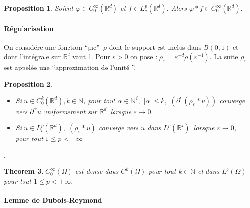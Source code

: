 \documentclass[3pt]{article}
\newtheorem{theorem}{Theorem}
\newtheorem{proposition}[theorem]{Proposition}
\begin{document}
\bigskip 

\begin{proposition}
Soient $\varphi \in C_{0}^{\infty }(\mathbb{R}^{d})$ et $f\in L_{c}^{p}(%
\mathbb{R}^{d}).$ Alors $\varphi \ast f\in C_{0}^{\infty }(\mathbb{R}^{d}).$
\end{proposition}

\bigskip 

\paragraph{R\'{e}gularisation}

\bigskip 

On consid\'{e}re une fonction \textquotedblleft pic\textquotedblright\ $\rho 
$ dont le support est inclus dans $B(0,1)$ et dont l'int\'{e}grale sur $%
\mathbb{R}^{d}$ vaut 1. Pour $\varepsilon >0$ on pose : $\rho _{\varepsilon
}=\varepsilon ^{-d}\rho (\varepsilon ^{-1})$. La suite $\rho _{\varepsilon }$
est appel\'{e}e une \textquotedblleft approximation de l'unit\'{e}%
\textquotedblright .

\bigskip 

\begin{proposition}

\begin{itemize}
\item Si $u\in C_{0}^{k}(\mathbb{R}^{d}),k\in \mathbb{N}$, pour tout $\alpha
\in \mathbb{N}^{d},$ $\left\vert \alpha \right\vert \leq k,$ $\left(
\partial ^{\alpha }\left( \rho _{\varepsilon }\ast u\right) \right) $
converge vers $\partial ^{\alpha }u$ uniformement sur $\mathbb{R}^{d}$\
lorsque $\varepsilon \rightarrow 0.$

\item Si $u\in L_{c}^{p}(\mathbb{R}^{d}),$ $\left( \rho _{\varepsilon }\ast
u\right) $ converge vers $u$ dans $L^{p}(\mathbb{R}^{d})$\ lorsque $%
\varepsilon \rightarrow 0$, pour tout $1\leq p<+\infty $
\end{itemize}
\end{proposition}

\bigskip ,

\begin{theorem}
$C_{0}^{\infty }(\mathbb{\Omega })$ est dense dans $C^{k}(\mathbb{\Omega })$
pour tout $k\in \mathbb{N}$ et dans $L^{p}(\mathbb{\Omega })$ pour tout $%
1\leq p<+\infty .$
\end{theorem}

\bigskip 

\paragraph{Lemme de Dubois-Reymond}
\end{document}
